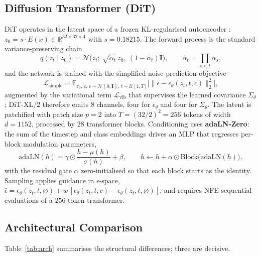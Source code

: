 \documentclass[conference]{IEEEtran}
\begin{document}
\subsection{Diffusion Transformer (DiT)}

DiT operates in the latent space of a frozen KL-regularised autoencoder
\cite{rombach2022ldm}: $z_0 = s\cdot E(x) \in \mathbb{R}^{32\times32\times4}$ with
$s{=}0.18215$. The forward process is the standard variance-preserving chain
\begin{equation}
q(z_t \mid z_0) = \mathcal{N}\!\big(z_t;\ \sqrt{\bar\alpha_t}\,z_0,\ (1-\bar\alpha_t)\mathbf{I}\big),
\qquad \bar\alpha_t = \prod_{s\le t}\alpha_s,
\end{equation}
and the network is trained with the simplified noise-prediction objective
\begin{equation}
\mathcal{L}_{\mathrm{simple}} =
\mathbb{E}_{z_0,\,c,\,\epsilon\sim\mathcal{N}(0,\mathbf{I}),\,t\sim\mathcal{U}[1,T]}
\Big[\big\|\epsilon - \epsilon_\theta(z_t,t,c)\big\|_2^2\Big],
\label{eq:lsimple}
\end{equation}
augmented by the variational term $\mathcal{L}_{\mathrm{vlb}}$ that supervises the learned
covariance $\Sigma_\theta$ \cite{nichol2021iddpm}; DiT-XL/2 therefore emits $8$ channels,
four for $\epsilon_\theta$ and four for $\Sigma_\theta$. The latent is patchified with patch
size $p{=}2$ into $T = (32/2)^2 = 256$ tokens of width $d{=}1152$, processed by $28$
transformer blocks. Conditioning uses \textbf{adaLN-Zero}: the sum of the timestep and class
embeddings drives an MLP that regresses per-block modulation parameters,
\begin{equation}
\mathrm{adaLN}(h) = \gamma\odot\frac{h-\mu(h)}{\sigma(h)} + \beta,
\qquad h \leftarrow h + \alpha\odot\mathrm{Block}\big(\mathrm{adaLN}(h)\big),
\end{equation}
with the residual gate $\alpha$ zero-initialised so that each block starts as the identity.
Sampling applies guidance in $\epsilon$-space,
$\hat\epsilon = \epsilon_\theta(z_t,t,\varnothing) + w\,[\epsilon_\theta(z_t,t,c)-\epsilon_\theta(z_t,t,\varnothing)]$,
and requires NFE sequential evaluations of a $256$-token transformer.

\subsection{Architectural Comparison}

Table~\ref{tab:arch} summarises the structural differences; three are decisive.
\end{document}

